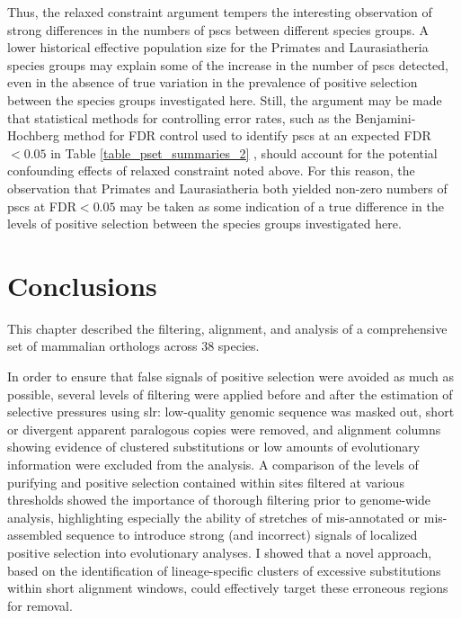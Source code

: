 Thus, the relaxed constraint argument tempers the interesting
observation of strong differences in the numbers of \acp{psc} between
different species groups. A lower historical effective population size
for the Primates and Laurasiatheria species groups may explain some of
the increase in the number of \acp{psc} detected, even in the absence
of true variation in the prevalence of positive selection between the
species groups investigated here. Still, the argument may be made that
statistical methods for controlling error rates, such as the
Benjamini-Hochberg method for FDR control used to identify \acp{psc}
at an expected FDR$<0.05$ in Table \ref{table_pset_summaries_2}
\citep{Benjamini1995}, should account for the potential confounding
effects of relaxed constraint noted above. For this reason, the
observation that Primates and Laurasiatheria both yielded non-zero
numbers of \acp{psc} at FDR$<0.05$ may be taken as some indication of
a true difference in the levels of positive selection between the
species groups investigated here.

\section{Conclusions}

This chapter described the filtering, alignment, and analysis of a
comprehensive set of mammalian orthologs across 38 species.

In order to ensure that false signals of positive selection were
avoided as much as possible, several levels of filtering were applied
before and after the estimation of \sw selective pressures using
\ac{slr}: low-quality genomic sequence was masked out, short or
divergent apparent paralogous copies were removed, and alignment
columns showing evidence of clustered \nsyn substitutions or low
amounts of evolutionary information were excluded from the analysis. A
comparison of the levels of purifying and positive selection contained
within sites filtered at various thresholds showed the importance of
thorough filtering prior to genome-wide analysis, highlighting
especially the ability of stretches of mis-annotated or mis-assembled
sequence to introduce strong (and incorrect) signals of localized
positive selection into evolutionary analyses. I showed that a novel
approach, based on the identification of lineage-specific clusters of
excessive \nsyn substitutions within short alignment windows, could
effectively target these erroneous regions for removal.

